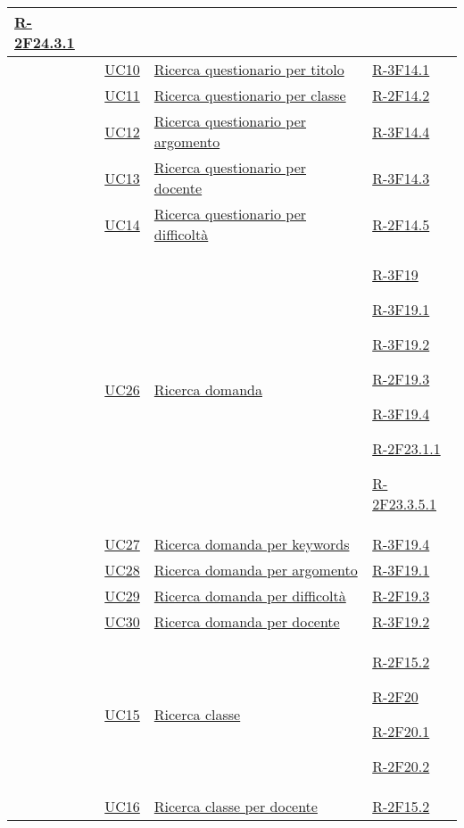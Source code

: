 \begin{longtable}[H]{p{} p{} p{} p{}}
	\hyperlink{R-2F24.3.1}{R-2F24.3.1}\\*
	\midrule
	& \hyperlink{UC10}{UC10} & \hyperlink{UC10}{Ricerca questionario per titolo} & \hyperlink{R-3F14.1}{R-3F14.1}\\*
	\midrule
	& \hyperlink{UC11}{UC11} & \hyperlink{UC11}{Ricerca questionario per classe} & \hyperlink{R-2F14.2}{R-2F14.2}\\*
	\midrule
	& \hyperlink{UC12}{UC12} & \hyperlink{UC12}{Ricerca questionario per argomento} & \hyperlink{R-3F14.4}{R-3F14.4}\\*
	\midrule
	& \hyperlink{UC13}{UC13} & \hyperlink{UC13}{Ricerca questionario per docente} & \hyperlink{R-3F14.3}{R-3F14.3}\\*
	\midrule
	& \hyperlink{UC14}{UC14} & \hyperlink{UC14}{Ricerca questionario per difficoltà} & \hyperlink{R-2F14.5}{R-2F14.5}\\*
	\midrule
	& \hyperlink{UC26}{UC26} & \hyperlink{UC26}{Ricerca domanda} & \hyperlink{R-3F19}{R-3F19}
	
	\hyperlink{R-3F19.1}{R-3F19.1}
	
	\hyperlink{R-3F19.2}{R-3F19.2}
	
	\hyperlink{R-2F19.3}{R-2F19.3}
	
	\hyperlink{R-3F19.4}{R-3F19.4}
	
	\hyperlink{R-2F23.1.1}{R-2F23.1.1}
	
	\hyperlink{R-2F23.3.5.1}{R-2F23.3.5.1}\\*
	\midrule
	& \hyperlink{UC27}{UC27} & \hyperlink{UC27}{Ricerca domanda per keywords} & \hyperlink{R-3F19.4}{R-3F19.4}\\*
	\midrule
	& \hyperlink{UC28}{UC28} & \hyperlink{UC28}{Ricerca domanda per argomento} & \hyperlink{R-3F19.1}{R-3F19.1}\\*
	\midrule
	& \hyperlink{UC29}{UC29} & \hyperlink{UC29}{Ricerca domanda per difficoltà} & \hyperlink{R-2F19.3}{R-2F19.3}\\*
	\midrule
	& \hyperlink{UC30}{UC30} & \hyperlink{UC30}{Ricerca domanda per docente} & \hyperlink{R-3F19.2}{R-3F19.2}\\*
	\midrule
	& \hyperlink{UC15}{UC15} & \hyperlink{UC15}{Ricerca classe} & \hyperlink{R-2F15.2}{R-2F15.2}
	
	\hyperlink{R-2F20}{R-2F20}
	
	\hyperlink{R-2F20.1}{R-2F20.1}
	
	\hyperlink{R-2F20.2}{R-2F20.2}\\*
	\midrule
	& \hyperlink{UC16}{UC16} & \hyperlink{UC16}{Ricerca classe per docente} & \hyperlink{R-2F15.2}{R-2F15.2}
	

\end{longtable}
